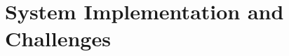 \documentclass[../main.tex]{subfiles}
\begin{document}
\chapter{System Implementation and Challenges} \label{ch:implementation}
\end{document}

